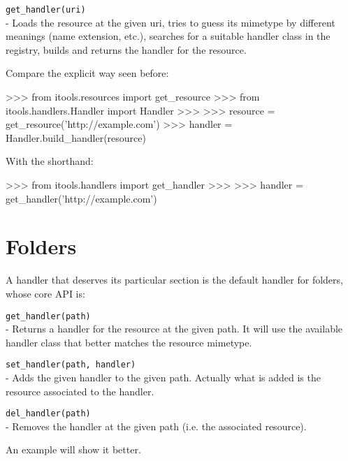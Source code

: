 \begin{api}
  {\tt get\_handler(uri)}\\
  - Loads the resource at the given uri, tries to guess its mimetype by
  different meanings (name extension, etc.), searches for a suitable
  handler class in the registry, builds and returns the handler for
  the resource.
\end{api}

Compare the explicit way seen before:

\begin{code}
    >>> from itools.resources import get_resource
    >>> from itools.handlers.Handler import Handler
    >>>
    >>> resource = get_resource('http://example.com')
    >>> handler = Handler.build_handler(resource)
\end{code}

With the shorthand:

\begin{code}
    >>> from itools.handlers import get_handler
    >>>
    >>> handler = get_handler('http://example.com')
\end{code}


\section{Folders}

A handler that deserves its particular section is the default handler for
folders, whose core API is:

\begin{api}
  {\tt get\_handler(path)}\\
  - Returns a handler for the resource at the given path. It will use the
    available handler class that better matches the resource mimetype.

  {\tt set\_handler(path, handler)}\\
  - Adds the given handler to the given path. Actually what is added is
    the resource associated to the handler.

  {\tt del\_handler(path)}\\
  - Removes the handler at the given path (i.e. the associated resource).
\end{api}

An example will show it better.

